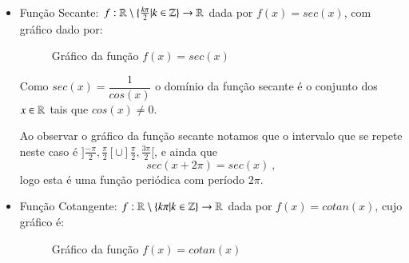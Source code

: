 \begin{itemize}
  Como $csc(x)= \dfrac{1}{sen (x)}$ o domínio da função cossecante é exatamente o conjunto dos $x \in \R$ tais que $sen(x) \neq 0$.
  
  Ao observar o gráfico da função cossecante notamos que o gráfico da função no intervalo $]0, \pi[ \cup ] \pi, 2 \pi[$ se repete indefinidamente, e ainda
  \[csc(x + 2\pi)= csc(x) \ , \]
  logo esta é uma função periódica, com período $2\pi$.

  \item Função Secante: $f: \mathbb{R} \setminus \{\frac{k\pi}{2} | k \in \mathbb{Z}\} \rightarrow \mathbb{R}$ dada por $f(x)= sec(x)$, com gráfico dado por:

  \begin{figure}[H]
  \centering
    \caption{Gráfico da função $f(x)= sec(x)$}
  \end{figure}
  
  Como $sec(x)= \dfrac{1}{cos (x)}$ o domínio da função secante é o conjunto dos $x \in \R$ tais que $cos(x) \neq 0$.
  
  Ao observar o gráfico da função secante notamos que o intervalo que se repete neste caso é $]\frac{-\pi}{2}, \frac{\pi}{2}[ \cup ] \frac{\pi}{2}, \frac{3\pi}{2}[$, e ainda que
  \[sec(x + 2\pi)= sec(x) \ ,\]
  logo esta é uma função periódica com período $2\pi$.

  \item Função Cotangente: $f: \mathbb{R} \setminus \{ k\pi | k \in \mathbb{Z}\} \rightarrow \mathbb{R}$ dada por $f(x)= cotan(x)$, cujo gráfico é:

  \begin{figure}[H]
  \centering
    \caption{Gráfico da função $f(x)= cotan(x)$}
  \end{figure}
  

\end{itemize}
